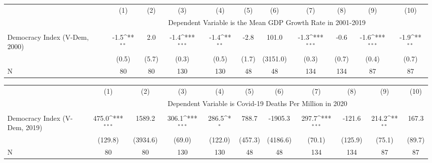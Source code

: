 {
\def\sym#1{\ifmmode^{#1}\else\(^{#1}\)\fi}
\begin{tabular}{l*{10}{c}}
\hline\hline
                    &\multicolumn{1}{c}{(1)}         &\multicolumn{1}{c}{(2)}         &\multicolumn{1}{c}{(3)}         &\multicolumn{1}{c}{(4)}         &\multicolumn{1}{c}{(5)}         &\multicolumn{1}{c}{(6)}         &\multicolumn{1}{c}{(7)}         &\multicolumn{1}{c}{(8)}         &\multicolumn{1}{c}{(9)}         &\multicolumn{1}{c}{(10)}         \\
&\multicolumn{10}{c}{ Dependent Variable is the Mean GDP Growth Rate in 2001-2019}\\\cline{2-11}\\[-1.8ex]
Democracy Index (V-Dem, 2000)&        -1.5\sym{**} &         2.0         &        -1.4\sym{***}&        -1.4\sym{**} &        -2.8         &       101.0         &        -1.3\sym{***}&        -0.6         &        -1.6\sym{***}&        -1.9\sym{**} \\
                    &       (0.5)         &       (5.7)         &       (0.3)         &       (0.5)         &       (1.7)         &    (3151.0)         &       (0.3)         &       (0.7)         &       (0.4)         &       (0.7)         \\
\hline
N                   &          80         &          80         &         130         &         130         &          48         &          48         &         134         &         134         &          87         &          87         \\
\hline\hline
\end{tabular}
}
{
\def\sym#1{\ifmmode^{#1}\else\(^{#1}\)\fi}
\begin{tabular}{l*{10}{c}}
\hline\hline
                    &\multicolumn{1}{c}{(1)}         &\multicolumn{1}{c}{(2)}         &\multicolumn{1}{c}{(3)}         &\multicolumn{1}{c}{(4)}         &\multicolumn{1}{c}{(5)}         &\multicolumn{1}{c}{(6)}         &\multicolumn{1}{c}{(7)}         &\multicolumn{1}{c}{(8)}         &\multicolumn{1}{c}{(9)}         &\multicolumn{1}{c}{(10)}         \\
&\multicolumn{10}{c}{ Dependent Variable is Covid-19 Deaths Per Million in 2020}\\\cline{2-11}\\[-1.8ex]
Democracy Index (V-Dem, 2019)&       475.0\sym{***}&      1589.2         &       306.1\sym{***}&       286.5\sym{*}  &       788.7         &     -1905.3         &       297.7\sym{***}&      -121.6         &       214.2\sym{**} &       167.3         \\
                    &     (129.8)         &    (3934.6)         &      (69.0)         &     (122.0)         &     (457.3)         &    (4186.6)         &      (70.1)         &     (125.9)         &      (75.1)         &      (89.7)         \\
\hline
N                   &          80         &          80         &         130         &         130         &          48         &          48         &         134         &         134         &          87         &          87         \\
\hline\hline
\end{tabular}
}
